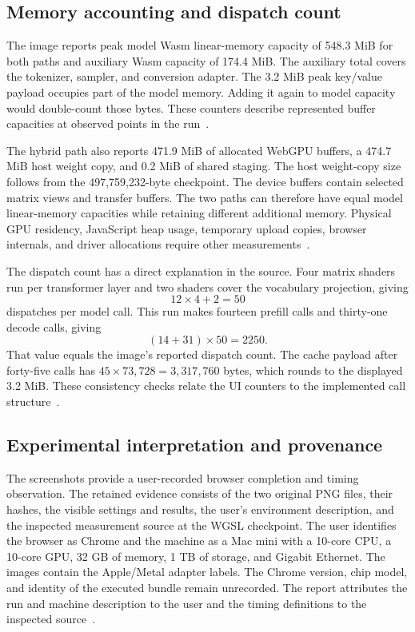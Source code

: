 \subsection{Memory accounting and dispatch count}

The image reports peak model Wasm linear-memory capacity of 548.3 MiB for both paths and auxiliary Wasm capacity of 174.4 MiB.  The auxiliary total covers the tokenizer, sampler, and conversion adapter.  The 3.2 MiB peak key/value payload occupies part of the model memory.  Adding it again to model capacity would double-count those bytes.  These counters describe represented buffer capacities at observed points in the run~\cite{screenshots,browser-source}.

The hybrid path also reports 471.9 MiB of allocated WebGPU buffers, a 474.7 MiB host weight copy, and 0.2 MiB of shared staging.  The host weight-copy size follows from the 497,759,232-byte checkpoint.  The device buffers contain selected matrix views and transfer buffers.  The two paths can therefore have equal model linear-memory capacities while retaining different additional memory.  Physical GPU residency, JavaScript heap usage, temporary upload copies, browser internals, and driver allocations require other measurements~\cite{screenshots,browser-source}.

The dispatch count has a direct explanation in the source.  Four matrix shaders run per transformer layer and two shaders cover the vocabulary projection, giving
\[
12\times4+2=50
\]
dispatches per model call.  This run makes fourteen prefill calls and thirty-one decode calls, giving
\[
(14+31)\times50=2250.
\]
That value equals the image's reported dispatch count.  The cache payload after forty-five calls has $45\times73{,}728=3{,}317{,}760$ bytes, which rounds to the displayed 3.2 MiB.  These consistency checks relate the UI counters to the implemented call structure~\cite{screenshots,browser-source}.

\subsection{Experimental interpretation and provenance}

The screenshots provide a user-recorded browser completion and timing observation.  The retained evidence consists of the two original PNG files, their hashes, the visible settings and results, the user's environment description, and the inspected measurement source at the WGSL checkpoint.  The user identifies the browser as Chrome and the machine as a Mac mini with a 10-core CPU, a 10-core GPU, 32 GB of memory, 1 TB of storage, and Gigabit Ethernet.  The images contain the Apple/Metal adapter labels.  The Chrome version, chip model, and identity of the executed bundle remain unrecorded.  The report attributes the run and machine description to the user and the timing definitions to the inspected source~\cite{screenshots,browser-source}.

